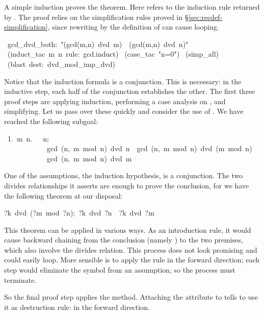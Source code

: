%
A simple induction proves the theorem.  Here  refers to the
induction rule returned by .  The proof relies on the simplification
rules proved in \S\ref{sec:recdef-simplification}, since rewriting by the
definition of  can cause looping.
\begin{isabelle}
\ gcd_dvd_both:\ "(gcd(m,n)\ dvd\ m)\ \isasymand\ (gcd(m,n)\ dvd\ n)"\isanewline
{}\ (induct_tac\ m\ n\ rule:\ gcd.induct)\isanewline
{}\ (case_tac\ "n=0")\isanewline
{}\ (simp_all)\isanewline
{}\ (blast\ dest:\ dvd_mod_imp_dvd)\isanewline
{}%
\end{isabelle}
Notice that the induction formula 
is a conjunction.  This is necessary: in the inductive step, each 
half of the conjunction establishes the other. The first three proof steps 
are applying induction, performing a case analysis on , 
and simplifying.  Let us pass over these quickly and consider
the use of {}.  We have reached the following 
subgoal: 
\begin{isabelle}
\ 1.\ {\isasymAnd}m\ n.\ \ \isacharless\ n;\isanewline
 \ \ \ \ \ \ \ \ \ \ \ \ gcd\ (n,\ m\ mod\ n)\ dvd\ n\ \isasymand\ gcd\ (n,\ m\ mod\ n)\ dvd\ (m\ mod\ n){\isasymrbrakk}\isanewline
\ \ \ \ \ \ \ \ \ \ \ \isasymLongrightarrow\ gcd\ (n,\ m\ mod\ n)\ dvd\ m
\end{isabelle}
%
One of the assumptions, the induction hypothesis, is a conjunction. 
The two divides relationships it asserts are enough to prove 
the conclusion, for we have the following theorem at our disposal: 
\begin{isabelle}
\isasymlbrakk?k\ dvd\ (?m\ mod\ ?n){;}\ ?k\ dvd\ ?n\isasymrbrakk\ \isasymLongrightarrow\ ?k\ dvd\ ?m%
\end{isabelle}
%
This theorem can be applied in various ways.  As an introduction rule, it
would cause backward chaining from  the conclusion (namely
) to the two premises, which 
also involve the divides relation. This process does not look promising
and could easily loop.  More sensible is  to apply the rule in the forward
direction; each step would eliminate  the  symbol from an
assumption, so the process must terminate.  

So the final proof step applies the  method.
Attaching the {} attribute to  tells 
to use it as destruction rule: in the forward direction.

